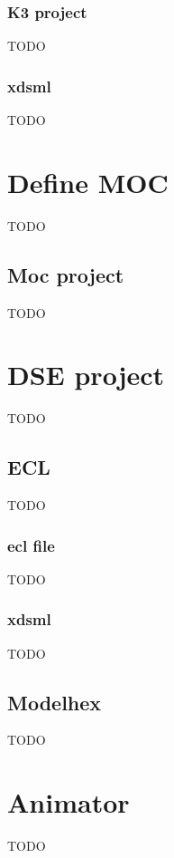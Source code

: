 \documentclass{gemoc} %
\begin{document}
\subsubsection{K3 project}
TODO
\subsubsection{xdsml}
TODO
\section{Define MOC}
\label{sec:Define_MOC}

TODO

\subsection{Moc project}
TODO


\section{DSE project}
\label{sec:DSE_project}

TODO

\subsection{ECL}
TODO


\subsubsection{ecl file}
TODO
\subsubsection{xdsml}
TODO
\subsection{Modelhex}
TODO


\section{Animator}
\label{sec:Animator}

TODO
\end{document}

